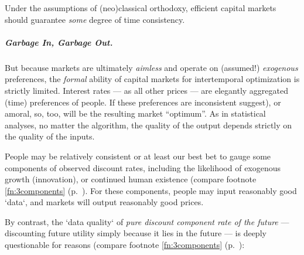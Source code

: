 Under the assumptions of (neo)classical orthodoxy, efficient capital markets should guarantee \emph{some} degree of time consistency. 

\subparagraph{Garbage In, Garbage Out.} But because markets are ultimately \emph{aimless} and operate on (assumed!) \emph{exogenous} preferences, the \emph{formal} ability of capital markets for intertemporal optimization is strictly limited. Interest rates --- as all other prices --- are elegantly aggregated (time) preferences of people. If these preferences are inconsistent suggest), or amoral, so, too, will be the resulting market ``optimum''. As in statistical analyses, no matter the algorithm, the quality of the output depends strictly on the quality of the inputs.

People may be relatively consistent or at least our best bet to gauge some components of observed discount rates, including the likelihood of exogenous growth (innovation), or continued human existence (compare footnote \ref{fn:3components} (p.~\pageref{fn:3components}). For these components, people may input reasonably good `data`, and markets will output reasonably good prices.

By contrast, the `data quality` of \emph{pure discount component rate of the future} --- discounting future utility simply because it lies in the future --- is deeply questionable for reasons (compare footnote \ref{fn:3components} (p.~\pageref{fn:3components}):

